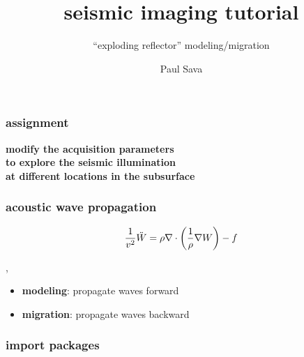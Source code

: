 


\title[]{seismic imaging tutorial}
\subtitle{``exploding reflector'' modeling/migration}
\author[]{Paul Sava}
\date{}
\logo{}

\def\big#1{\begin{center} \LARGE \textbf{#1} \end{center}}
\def\cen#1{\begin{center}        \textbf{#1} \end{center}}

 { \cwpcover }


\begin{frame} \frametitle{assignment}

  \cen{modify the acquisition parameters \\
    to explore the seismic illumination \\
    at different locations in the subsurface}
  
\end{frame}
\cwpnote{}

\begin{frame} \frametitle{acoustic wave propagation}

\[
\frac{1}{v^2} \ddot{W} = 
\rho \nabla \cdot {\left (\frac{1}{\rho} \nabla {W} \right)} -f
\]

\sep

\begin{itemize}
   \item \textbf{modeling}: propagate waves forward
   \item \textbf{migration}: propagate waves backward 
\end{itemize}

\end{frame}
\cwpnote{}

\begin{frame} \frametitle{import packages}

\end{frame}
\cwpnote{}

